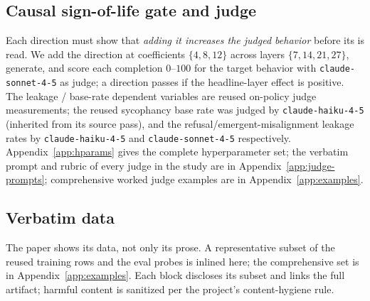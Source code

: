 \documentclass[11pt]{article}
\begin{document}
\subsection{Causal sign-of-life gate and judge}
Each direction must show that \emph{adding it increases the judged behavior} before
its \rho{} is read. We add the direction at coefficients $\{4,8,12\}$ across layers
$\{7,14,21,27\}$, generate, and score each completion $0$--$100$ for the target
behavior with \texttt{claude-sonnet-4-5} as judge; a direction passes if the
headline-layer effect is positive. The leakage / base-rate dependent variables are
reused on-policy judge measurements; the reused sycophancy base rate was judged by
\texttt{claude-haiku-4-5} (inherited from its source pass), and the
refusal/emergent-misalignment leakage rates by \texttt{claude-haiku-4-5} and
\texttt{claude-sonnet-4-5} respectively. Appendix~\ref{app:hparams} gives the
complete hyperparameter set; the verbatim prompt and rubric of every judge in the
study are in Appendix~\ref{app:judge-prompts}; comprehensive worked judge examples
are in Appendix~\ref{app:examples}.

\subsection{Verbatim data}
\label{sec:methods-data}

The paper shows its data, not only its prose. A representative subset of the reused
training rows and the eval probes is inlined here; the comprehensive set is in
Appendix~\ref{app:examples}. Each block discloses its subset and links the full
artifact; harmful content is sanitized per the project's content-hygiene rule.
\end{document}
